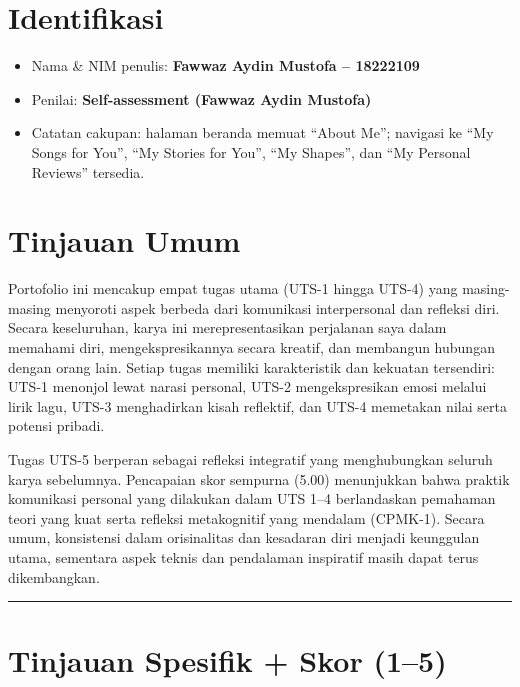 \documentclass[
  letterpaper,
  DIV=11,
  numbers=noendperiod]{scrreprt}
\providecommand{\tightlist}{%
  \setlength{\itemsep}{0pt}\setlength{\parskip}{0pt}}
\begin{document}
\section{Identifikasi}\label{identifikasi}

\begin{itemize}
\tightlist
\item
  Nama \& NIM penulis: \textbf{Fawwaz Aydin Mustofa -- 18222109}
\item
  Penilai: \textbf{Self-assessment (Fawwaz Aydin Mustofa)}
\item
  Catatan cakupan: halaman beranda memuat ``About Me''; navigasi ke ``My
  Songs for You'', ``My Stories for You'', ``My Shapes'', dan ``My
  Personal Reviews'' tersedia.
\end{itemize}

\section{Tinjauan Umum}\label{tinjauan-umum}

Portofolio ini mencakup empat tugas utama (UTS-1 hingga UTS-4) yang
masing-masing menyoroti aspek berbeda dari komunikasi interpersonal dan
refleksi diri. Secara keseluruhan, karya ini merepresentasikan
perjalanan saya dalam memahami diri, mengekspresikannya secara kreatif,
dan membangun hubungan dengan orang lain. Setiap tugas memiliki
karakteristik dan kekuatan tersendiri: UTS-1 menonjol lewat narasi
personal, UTS-2 mengekspresikan emosi melalui lirik lagu, UTS-3
menghadirkan kisah reflektif, dan UTS-4 memetakan nilai serta potensi
pribadi.

Tugas UTS-5 berperan sebagai refleksi integratif yang menghubungkan
seluruh karya sebelumnya. Pencapaian skor sempurna (5.00) menunjukkan
bahwa praktik komunikasi personal yang dilakukan dalam UTS 1--4
berlandaskan pemahaman teori yang kuat serta refleksi metakognitif yang
mendalam (CPMK-1). Secara umum, konsistensi dalam orisinalitas dan
kesadaran diri menjadi keunggulan utama, sementara aspek teknis dan
pendalaman inspiratif masih dapat terus dikembangkan.

\begin{center}\rule{0.5\linewidth}{0.5pt}\end{center}

\section{Tinjauan Spesifik + Skor
(1--5)}\label{tinjauan-spesifik-skor-15}
\end{document}
